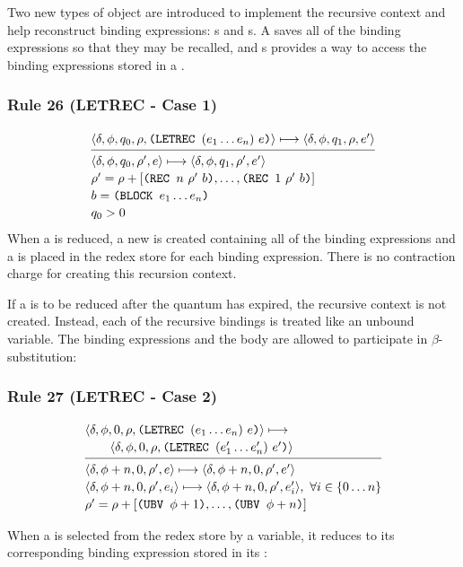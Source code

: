 Two new types of object are introduced to implement the recursive context and
help reconstruct  binding expressions: s and
s. A  saves all of the binding expressions so that they
may be recalled, and s provides a way to access the binding
expressions stored in a .

\subsubsection*{Rule 26 (LETREC - Case 1)}
\[
\semanticrule{
\cfg{\delta}{\phi}{q_0}{\rho}{\THOR{(LETREC }(e_1\ldots e_n)\ e\THOR{)}}\redsto
\cfg{\delta}{\phi}{q_1}{\rho}{e'}
}{
\cfg{\delta}{\phi}{q_0}{\rho'}{e}\redsto
\cfg{\delta}{\phi}{q_1}{\rho'}{e'}\\
\rho'=\rho+[\THOR{(REC }n\ \rho'\ b\THOR{)},\ldots,\THOR{(REC }1\ \rho'\ b\THOR{)}]\\ b=\THOR{(BLOCK }e_1\ldots e_n\THOR{)}\\ q_0>0
}
\]
When a  is reduced, a new  is created containing all of
the binding expressions and a  is placed in the redex store for each
binding expression. There is no contraction charge for creating this recursion
context.

If a  is to be reduced after the quantum has expired, the recursive
context is not created. Instead, each of the recursive bindings is treated like
an unbound variable. The binding expressions and the body are allowed to
participate in \(\beta\)-substitution:

\subsubsection*{Rule 27 (LETREC - Case 2)}
\[
\semanticrule{
\cfg{\delta}{\phi}{0}{\rho}{\THOR{(LETREC }(e_1\ldots e_n)\ e\THOR{)}}\redsto\\ \qquad
\cfg{\delta}{\phi}{0}{\rho}{\THOR{(LETREC }(e'_1\ldots e'_n)\ e'\THOR{)}}
}{
\cfg{\delta}{\phi+n}{0}{\rho'}{e}\redsto
\cfg{\delta}{\phi+n}{0}{\rho'}{e'}
\\
\cfg{\delta}{\phi+n}{0}{\rho'}{e_i}\redsto
\cfg{\delta}{\phi+n}{0}{\rho'}{e'_i},\ \forall i\in\{0\ldots n\}\\
\rho'=\rho+[\THOR{(UBV }\phi+1\THOR{)},\ldots,\THOR{(UBV }\phi+n\THOR{)}]
}
\]

When a  is selected from the redex store by a variable, it reduces to
its corresponding binding expression stored in its :

